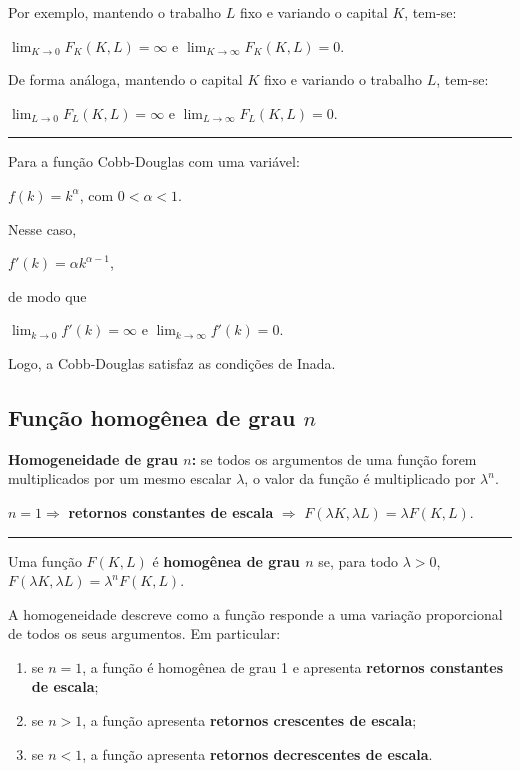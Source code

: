\documentclass[12pt]{article}
\begin{document}
Por exemplo, mantendo o trabalho $L$ fixo e variando o capital $K$, tem-se:

$\lim_{K \to 0} F_K(K,L)=\infty$
\quad e \quad
$\lim_{K \to \infty} F_K(K,L)=0$.

De forma análoga, mantendo o capital $K$ fixo e variando o trabalho $L$, tem-se:

$\lim_{L \to 0} F_L(K,L)=\infty$
\quad e \quad
$\lim_{L \to \infty} F_L(K,L)=0$.

\medskip
\noindent\rule{\textwidth}{0.4pt}
\medskip

Para a função Cobb-Douglas com uma variável:

$f(k)=k^\alpha$, \quad com $0<\alpha<1$.

Nesse caso,

$f'(k)=\alpha k^{\alpha-1}$,

de modo que

$\lim_{k \to 0} f'(k)=\infty$
\quad e \quad
$\lim_{k \to \infty} f'(k)=0$.

Logo, a Cobb-Douglas satisfaz as condições de Inada.

\newpage

\subsection{Função homogênea de grau $n$}

\textbf{Homogeneidade de grau $n$:} se todos os argumentos de uma função forem multiplicados por um mesmo escalar $\lambda$, o valor da função é multiplicado por $\lambda^n$.

$n = 1 \Rightarrow$ \textbf{retornos constantes de escala} $\Rightarrow$ $F(\lambda K,\lambda L)=\lambda F(K,L)$.

\medskip
\noindent\rule{\textwidth}{0.4pt}
\medskip

Uma função $F(K,L)$ é \textbf{homogênea de grau $n$} se, para todo $\lambda > 0$,
$F(\lambda K,\lambda L)=\lambda^n F(K,L)$.

A homogeneidade descreve como a função responde a uma variação proporcional de todos os seus argumentos.
Em particular:

\begin{enumerate}
    \item se $n=1$, a função é homogênea de grau 1 e apresenta \textbf{retornos constantes de escala};
    \item se $n>1$, a função apresenta \textbf{retornos crescentes de escala};
    \item se $n<1$, a função apresenta \textbf{retornos decrescentes de escala}.
\end{enumerate}
\end{document}

